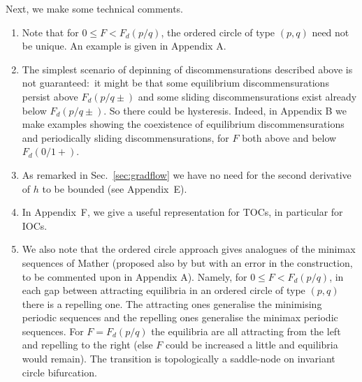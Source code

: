 \documentclass[12pt]{article}
\begin{document}
Next, we make some technical comments.
\begin{enumerate}
\item Note that for $0 \le F < F_d(p/q)$, the ordered circle of type $(p,q)$ need not be unique.  An example is given in Appendix A.

\item The simplest scenario of depinning of discommensurations described above is not guaranteed:~it might be that some equilibrium discommensurations persist above $F_d(p/q\pm)$ and some sliding discommensurations exist already below $F_d(p/q\pm)$.  So there could be hysteresis.  Indeed,
in Appendix B we make  examples showing the coexistence of equilibrium discommensurations and periodically sliding discommensurations, for $F$ both above and below $F_d(0/1+)$. %

\item As remarked in Sec.~\ref{sec:gradflow} we have no need for the second derivative of $h$ to be bounded (see Appendix~E).

\item In Appendix~F, we give a useful representation for TOCs, in particular for IOCs.

\item We also note that the ordered circle approach gives analogues of the minimax sequences of Mather \cite{Mat2} (proposed also by \cite{ALA} but with an error in the construction, to be commented upon in Appendix A).  Namely, for $0\le F < F_d(p/q)$, in each gap between attracting equilibria in an ordered circle of type $(p,q)$ there is a repelling one.  The attracting ones generalise the minimising periodic sequences and the repelling ones generalise the minimax periodic sequences.  For $F=F_d(p/q)$ the equilibria are all attracting from the left and repelling to the right (else $F$ could be increased a little and equilibria would remain). The transition is topologically a saddle-node on invariant circle bifurcation.
\end{enumerate}

\end{document}
